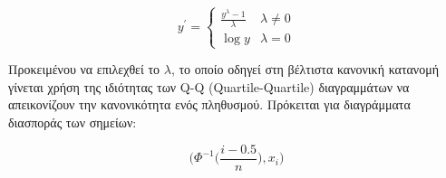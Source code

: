 \begin{equation}
y^{'}=
\begin{cases}
\frac{y^{\lambda} -1}{\lambda} &  \lambda \neq 0\\
\log{y} & \lambda = 0
\end{cases}
\end{equation} 

Προκειμένου να επιλεχθεί το $\lambda$, το οποίο οδηγεί στη βέλτιστα κανονική κατανομή γίνεται χρήση της ιδιότητας των Q-Q (Quartile-Quartile) διαγραμμάτων να απεικονίζουν την κανονικότητα ενός πληθυσμού. Πρόκειται για διαγράμματα διασποράς των σημείων:

\begin{equation}
\Big( \Phi^{-1} \big(\frac{i-0.5}{n} \big), x_{i} \Big)
\end{equation} 
 
